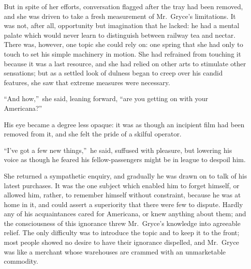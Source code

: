 \documentclass[12pt,a4paper]{book}
\begin{document}
But in spite of her efforts, conversation flagged after the tray
had been removed, and she was driven to take a fresh measurement
of Mr.\ Gryce's limitations. It was not, after all, opportunity
but imagination that he lacked: he had a mental palate which
would never learn to distinguish between railway tea and nectar. 
There was, however, one topic she could rely on: one spring that
she had only to touch to set his simple machinery in motion. She
had refrained from touching it because it was a last resource,
and she had relied on other arts to stimulate other sensations;
but as a settled look of dulness began to creep over his candid
features, she saw that extreme measures were necessary.





``And how,''\ she said, leaning forward, ``are you getting on with
your Americana?''





His eye became a degree less opaque: it was as though an
incipient film had been removed from it, and she felt the pride
of a skilful operator.





``I've got a few new things,''\ he said, suffused with pleasure, but
lowering his voice as though he feared his fellow-passengers
might be in league to despoil him.





She returned a sympathetic enquiry, and gradually he was drawn on
to talk of his latest purchases. It was the one subject which
enabled him to forget himself, or allowed him, rather, to
remember himself without constraint, because he was at home in
it, and could assert a superiority that there were few to
dispute. Hardly any of his acquaintances cared for Americana, or
knew anything about them; and the consciousness of this ignorance
threw Mr.\ Gryce's knowledge into agreeable relief. The only
difficulty was to introduce the topic and to keep it to the
front; most people showed no desire to have their ignorance
dispelled, and Mr.\ Gryce was like a merchant whose warehouses are
crammed with an unmarketable commodity.
\end{document}
